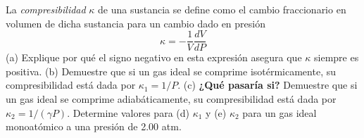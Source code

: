\item La \textit{compresibilidad} $\kappa$ de una sustancia se define como el cambio fraccionario en volumen de dicha sustancia para un cambio dado en presión
$$ \kappa = -\frac{1}{V} \frac{dV}{dP} $$
(a) Explique por qué el signo negativo en esta expresión asegura que $\kappa$ siempre es positiva. (b) Demuestre que si un gas ideal se comprime isotérmicamente, su compresibilidad está dada por $\kappa_1 = 1/P$. (c) \textbf{¿Qué pasaría si?} Demuestre que si un gas ideal se comprime adiabáticamente, su compresibilidad está dada por $\kappa_2 = 1/(\gamma P)$. Determine valores para (d) $\kappa_1$ y (e) $\kappa_2$ para un gas ideal monoatómico a una presión de 2.00 atm.
